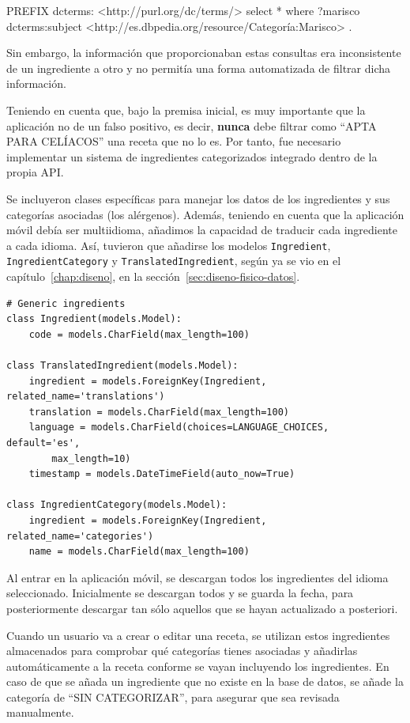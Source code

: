 \documentclass[a4paper,12pt]{article}
\begin{document}
\begin{bashcode}
PREFIX dcterms: <http://purl.org/dc/terms/>
select * where{
  ?marisco dcterms:subject <http://es.dbpedia.org/resource/Categoría:Marisco> .
}
\end{bashcode}

Sin embargo, la información que proporcionaban estas consultas era inconsistente
de un ingrediente a otro y no permitía una forma automatizada de filtrar dicha
información.

Teniendo en cuenta que, bajo la premisa inicial, es muy importante que la
aplicación no de un falso positivo, es decir, \textbf{nunca} debe filtrar como
``APTA PARA CELÍACOS'' una receta que no lo es. Por tanto, fue necesario
implementar un sistema de ingredientes categorizados integrado dentro de la
propia API.

Se incluyeron clases específicas para manejar los datos de los ingredientes y
sus categorías asociadas (los alérgenos). Además, teniendo en cuenta que la
aplicación móvil debía ser multiidioma, añadimos la capacidad de traducir cada
ingrediente a cada idioma. Así, tuvieron que añadirse los modelos
\texttt{Ingredient}, \texttt{IngredientCategory} y \texttt{TranslatedIngredient},
según ya se vio en el capítulo~\ref{chap:diseno}, en la
sección~\ref{sec:diseno-fisico-datos}.

\begin{verbatim}
# Generic ingredients
class Ingredient(models.Model):
    code = models.CharField(max_length=100)

class TranslatedIngredient(models.Model):
    ingredient = models.ForeignKey(Ingredient, related_name='translations')
    translation = models.CharField(max_length=100)
    language = models.CharField(choices=LANGUAGE_CHOICES, default='es',
        max_length=10)
    timestamp = models.DateTimeField(auto_now=True)

class IngredientCategory(models.Model):
    ingredient = models.ForeignKey(Ingredient, related_name='categories')
    name = models.CharField(max_length=100)
\end{verbatim}

Al entrar en la aplicación móvil, se descargan todos los ingredientes del
idioma seleccionado. Inicialmente se descargan todos y se guarda la fecha, para
posteriormente descargar tan sólo aquellos que se hayan actualizado a posteriori.

Cuando un usuario va a crear o editar una receta, se utilizan estos ingredientes
almacenados para comprobar qué categorías tienes asociadas y añadirlas
automáticamente a la receta conforme se vayan incluyendo los ingredientes. En
caso de que se añada un ingrediente que no existe en la base de datos, se añade
la categoría de ``SIN CATEGORIZAR'', para asegurar que sea revisada manualmente.
\end{document}
